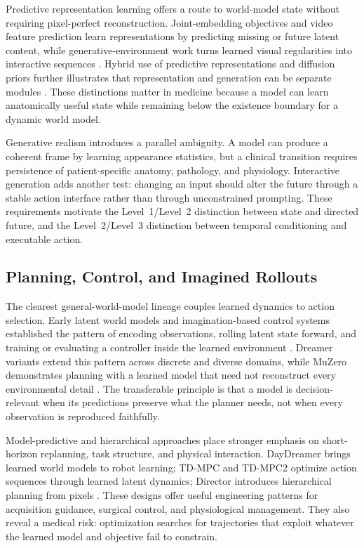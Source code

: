 Predictive representation learning offers a route to world-model state without requiring pixel-perfect reconstruction. Joint-embedding objectives and video feature prediction learn representations by predicting missing or future latent content, while generative-environment work turns learned visual regularities into interactive sequences \citep{Assran2023Selfsupervisedlearning,Bardes2024RevisitingFeaturePrediction,Bruce2024Genie}. Hybrid use of predictive representations and diffusion priors further illustrates that representation and generation can be separate modules \citep{Park2026BeyondGenerativePriors}. These distinctions matter in medicine because a model can learn anatomically useful state while remaining below the existence boundary for a dynamic world model.

Generative realism introduces a parallel ambiguity. A model can produce a coherent frame by learning appearance statistics, but a clinical transition requires persistence of patient-specific anatomy, pathology, and physiology. Interactive generation adds another test: changing an input should alter the future through a stable action interface rather than through unconstrained prompting. These requirements motivate the Level~1/Level~2 distinction between state and directed future, and the Level~2/Level~3 distinction between temporal conditioning and executable action.

\subsection{Planning, Control, and Imagined Rollouts}

The clearest general-world-model lineage couples learned dynamics to action selection. Early latent world models and imagination-based control systems established the pattern of encoding observations, rolling latent state forward, and training or evaluating a controller inside the learned environment \citep{unknown2018WorldModels,Hafner2019DreamControlLearning,Hafner2019LearningLatentDynamics}. Dreamer variants extend this pattern across discrete and diverse domains, while MuZero demonstrates planning with a learned model that need not reconstruct every environmental detail \citep{Hafner2021MasteringAtariDiscrete,Hafner2023DreamerV3,Schrittwieser2020MuZero}. The transferable principle is that a model is decision-relevant when its predictions preserve what the planner needs, not when every observation is reproduced faithfully.

Model-predictive and hierarchical approaches place stronger emphasis on short-horizon replanning, task structure, and physical interaction. DayDreamer brings learned world models to robot learning; TD-MPC and TD-MPC2 optimize action sequences through learned latent dynamics; Director introduces hierarchical planning from pixels \citep{Wu2022DaydreamerWorldModels,Hansen2022TemporalDifferenceLearning,Hansen2024TdMpc2Scalable,Hafner2022DeepHierarchicalPlanning}. These designs offer useful engineering patterns for acquisition guidance, surgical control, and physiological management. They also reveal a medical risk: optimization searches for trajectories that exploit whatever the learned model and objective fail to constrain.

